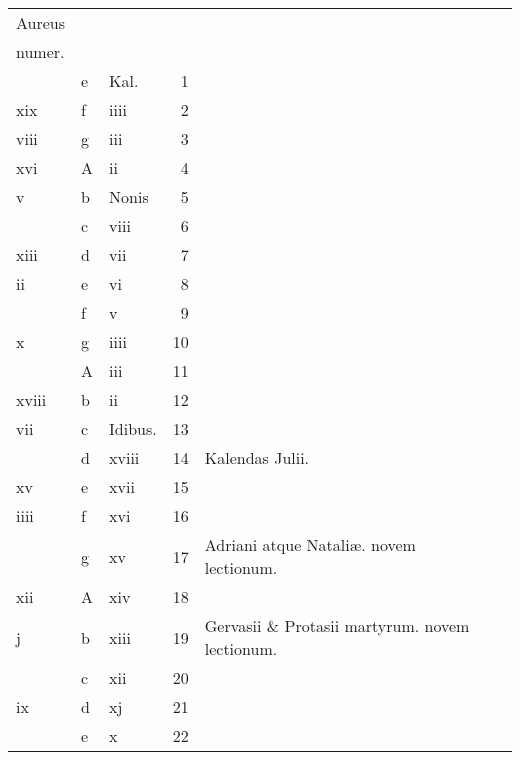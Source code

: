 \documentclass[11pt,openany]{book}
\begin{document}
\begin{center}
\begin{tabular}{l | l | l | r | l r}
\color{Red}Aureus & & & & \color{Red} \\
\color{Red}numer. & & & & \color{Red} \\
\color{Red}  & e & \color{Red} Kal. & 1 & & \color{Red} \\
\color{Red} xix & f & \color{Red} iiii & 2 & & \color{Red} \\
\color{Red} viii & g & \color{Red} iii & 3 & & \color{Red} \\
\color{Red} xvi & \color{Red} A & \color{Red} ii & 4 & & \color{Red} \\
\color{Red} v & b & Nonis & 5 & & \color{Red} \\
\color{Red}  & c & \color{Red} viii & 6 & & \color{Red} \\
\color{Red} xiii & d & \color{Red} vii & 7 & & \color{Red} \\
\color{Red} ii & e & \color{Red} vi & 8 & & \color{Red} \\
\color{Red}  & f & \color{Red} v & 9 & & \color{Red} \\
\color{Red} x & g & \color{Red} iiii & 10 & & \color{Red} \\
\color{Red}  & \color{Red} A & \color{Red} iii & 11 & & \color{Red} \\
\color{Red} xviii & b & \color{Red} ii & 12 & & \color{Red} \\
\color{Red} vii & c & Idibus. & 13 & & \color{Red} \\
\color{Red}  & d & \color{Red} xviii & 14 & \qquad \color{Red} Kalendas Julii. & \color{Red} \\
\color{Red} xv & e & \color{Red} xvii & 15 & & \color{Red} \\
\color{Red} iiii & f & \color{Red} xvi & 16 & & \color{Red} \\
\color{Red}  & g & \color{Red} xv & 17 & Adriani atque Natali\ae . \color{Red} novem lectionum. & \color{Red} \\
\color{Red} xii & \color{Red} A & \color{Red} xiv & 18 & & \color{Red} \\
\color{Red} j & b & \color{Red} xiii & 19 & Gervasii \& Protasii martyrum. \color{Red} novem lectionum. & \color{Red} \\
\color{Red}  & c & \color{Red} xii & 20 & & \color{Red} \\
\color{Red} ix & d & \color{Red} xj & 21 & & \color{Red} \\
\color{Red}  & e & \color{Red} x & 22 & & \color{Red} \\

\end{tabular}
\end{center}
\end{document}
